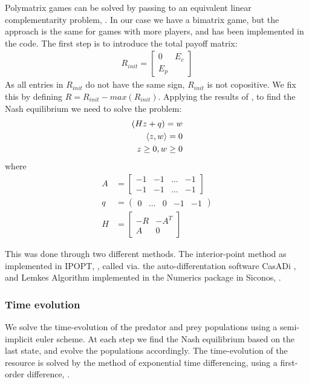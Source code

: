 Polymatrix games can be solved by passing to an equivalent linear complementarity problem,  \citep{miller1991copositive}. In our case we have a bimatrix game, but the approach is the same for games with more players, and has been implemented in the code. The first step is to introduce the total payoff matrix:
\begin{align}
	R_{init} = \begin{bmatrix} 0 & E_c \\ E_p \end{bmatrix}
\end{align}
As all entries in $R_{init}$ do not have the same sign, $R_{init}$ is not copositive. We fix this by defining $R=R_{init}-max(R_{init})$.
Applying the results of \citep{miller1991copositive}, to find the Nash equilibrium we need to solve the problem:
\begin{align}
	(Hz+q) = w & \\
	\left \langle z,w \right \rangle = 0 & \\
	z\geq 0, w\geq 0
\end{align}
where
\begin{align}
	A &= \begin{bmatrix} -1 &-1 & \dots & -1 \\  -1 &-1 & \dots & -1 \end{bmatrix} \\
	q &= \begin{pmatrix} 0 &\dots & 0 & -1 & -1 \end{pmatrix}   \\
	H &= \begin{bmatrix} -R & -A^T \\ A & 0 \end{bmatrix}
\end{align}

This was done through two different methods. The interior-point method as implemented in IPOPT, \citep{wachter2006implementation}, called via. the auto-differentation software CasADi \citep{Andersson2019}, and Lemkes Algorithm implemented in the Numerics package in Siconos, \citep{acary2019introduction}.

\subsubsection*{Time evolution}

We solve the time-evolution of the predator and prey populations using a semi-implicit euler scheme. At each step we find the Nash equilibrium based on the last state, and evolve the populations accordingly. The time-evolution of the resource is solved by the method of exponential time differencing, using a first-order difference, \citep{hochbruck2010exponential}.

